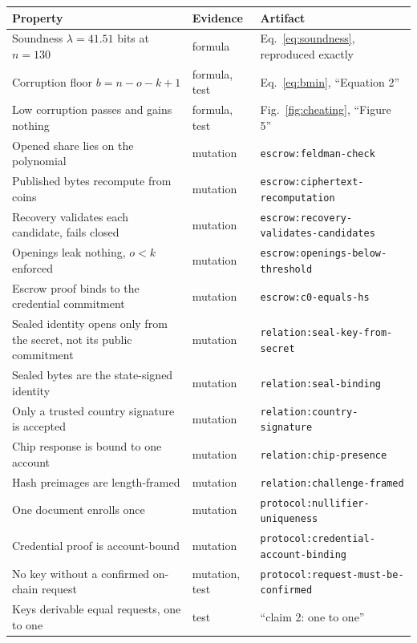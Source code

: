 \documentclass[11pt,a4paper]{article}
\begin{document}
\begin{table}[h]
\centering
\scriptsize
\setlength{\tabcolsep}{4pt}
\begin{tabular}{p{5.0cm}p{1.6cm}p{5.0cm}}
\toprule
Property & Evidence & Artifact \\
\midrule
Soundness $\lambda = 41.51$ bits at $n{=}130$ & formula &
  Eq.~\ref{eq:soundness}, reproduced exactly \\
Corruption floor $b = n-o-k+1$ & formula, test &
  Eq.~\ref{eq:bmin}, ``Equation 2'' \\
Low corruption passes and gains nothing & formula, test &
  Fig.~\ref{fig:cheating}, ``Figure 5'' \\
Opened share lies on the polynomial & mutation &
  \texttt{escrow:feldman-check} \\
Published bytes recompute from coins & mutation &
  \texttt{escrow:ciphertext-\allowbreak recomputation} \\
Recovery validates each candidate, fails closed & mutation &
  \texttt{escrow:recovery-\allowbreak validates-\allowbreak candidates} \\
Openings leak nothing, $o < k$ enforced & mutation &
  \texttt{escrow:openings-below-threshold} \\
Escrow proof binds to the credential commitment & mutation &
  \texttt{escrow:c0-equals-hs} \\
Sealed identity opens only from the secret, not its
public commitment & mutation &
  \texttt{relation:seal-key-from-secret} \\
Sealed bytes are the state-signed identity & mutation &
  \texttt{relation:seal-binding} \\
Only a trusted country signature is accepted & mutation &
  \texttt{relation:country-signature} \\
Chip response is bound to one account & mutation &
  \texttt{relation:chip-presence} \\
Hash preimages are length-framed & mutation &
  \texttt{relation:challenge-framed} \\
One document enrolls once & mutation &
  \texttt{protocol:nullifier-uniqueness} \\
Credential proof is account-bound & mutation &
  \texttt{protocol:credential-\allowbreak account-binding} \\
No key without a confirmed on-chain request & mutation, test &
  \texttt{protocol:request-must-be-confirmed} \\
Keys derivable equal requests, one to one & test &
  ``claim 2: one to one'' \\

\end{tabular}
\end{table}
\end{document}
